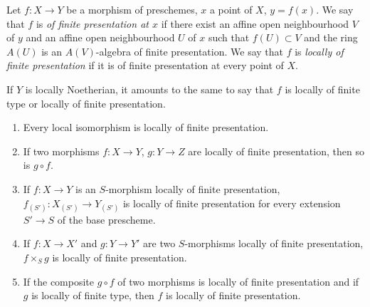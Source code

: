 \begin{definition}[1.4.2]
\label{IV.1.4.2}
Let $f:X\to Y$ be a morphism of preschemes, $x$ a point of $X$, $y=f(x)$.
We say that $f$ is \emph{of finite presentation at $x$} if there exist an
affine open neighbourhood $V$ of $y$ and an affine open neighbourhood $U$ of
$x$ such that $f(U)\subset V$ and the ring $A(U)$ is an $A(V)$-algebra of
finite presentation. We say that $f$ is \emph{locally of finite presentation}
if it is of finite presentation at every point of $X$.
\end{definition}

If $Y$ is locally Noetherian, it amounts to the same to say that $f$ is
locally of finite type or locally of finite presentation.

\begin{proposition}[1.4.3]
\label{IV.1.4.3}
\begin{enumerate}
  \item[(i)] Every local isomorphism is locally of finite presentation.
  \item[(ii)] If two morphisms $f:X\to Y$, $g:Y\to Z$ are locally of
  finite presentation, then so is $g\circ f$.


  \item[(iii)] If $f:X\to Y$ is an $S$-morphism locally of finite
  presentation, $f_{(S')}:X_{(S')}\to Y_{(S')}$ is locally of finite
  presentation for every extension $S'\to S$ of the base prescheme.
  \item[(iv)] If $f:X\to X'$ and $g:Y\to Y'$ are two $S$-morphisms
  locally of finite presentation, $f\times_Sg$ is locally of finite
  presentation.
  \item[(v)] If the composite $g\circ f$ of two morphisms is locally of
  finite presentation and if $g$ is locally of finite type, then $f$ is
  locally of finite presentation.
\end{enumerate}
\end{proposition}

